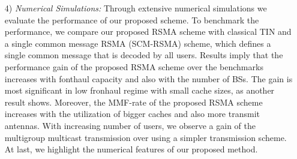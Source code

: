 \documentclass[12pt,draftcls,onecolumn]{IEEEtran}
\theoremstyle{remark}
\theoremstyle{definition}
\begin{document}
\begin{itemize}
\item[4)] \textit{Numerical Simulations:} Through extensive numerical simulations we evaluate the performance of our proposed scheme. To benchmark the performance, we compare our proposed RSMA scheme with classical TIN and a single common message RSMA (SCM-RSMA) scheme, which defines a single common message that is decoded by all users. Results imply that the performance gain of the proposed RSMA scheme over the benchmarks increases with fonthaul capacity and also with the number of BSs. The gain is most significant in low fronhaul regime with small cache sizes, as another result shows. Moreover, the MMF-rate of the proposed RSMA scheme increases with the utilization of bigger caches and also more transmit antennas. With increasing number of users, we observe a gain of the multigroup multicast transmission over using a simpler transmission scheme. At last, we highlight the numerical features of our proposed method.
%	
	
\end{itemize}   
\end{document}
